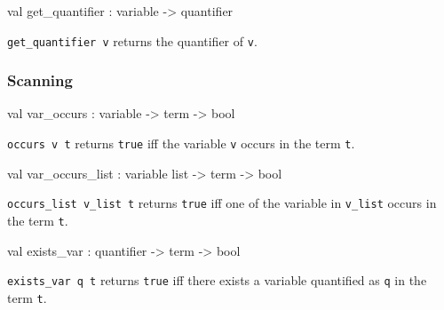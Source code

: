 \label{val:Term.get-underscorequantifier}\begin{ocamldoccode}
val get_quantifier : variable -> quantifier
\end{ocamldoccode}
\begin{ocamldocdescription}
{\tt{get\_quantifier v}} returns the quantifier of {\tt{v}}.


\end{ocamldocdescription}




\subsubsection{Scanning}




\label{val:Term.var-underscoreoccurs}\begin{ocamldoccode}
val var_occurs : variable -> term -> bool
\end{ocamldoccode}
\begin{ocamldocdescription}
{\tt{occurs v t}} returns {\tt{true}} iff the variable {\tt{v}} occurs in the term {\tt{t}}.


\end{ocamldocdescription}




\label{val:Term.var-underscoreoccurs-underscorelist}\begin{ocamldoccode}
val var_occurs_list : variable list -> term -> bool
\end{ocamldoccode}
\begin{ocamldocdescription}
{\tt{occurs\_list v\_list t}} returns {\tt{true}} iff one of the variable in {\tt{v\_list}} occurs in the term {\tt{t}}.


\end{ocamldocdescription}




\label{val:Term.exists-underscorevar}\begin{ocamldoccode}
val exists_var : quantifier -> term -> bool
\end{ocamldoccode}
\begin{ocamldocdescription}
{\tt{exists\_var q t}} returns {\tt{true}} iff there exists a variable quantified as {\tt{q}} in the term {\tt{t}}.


\end{ocamldocdescription}





